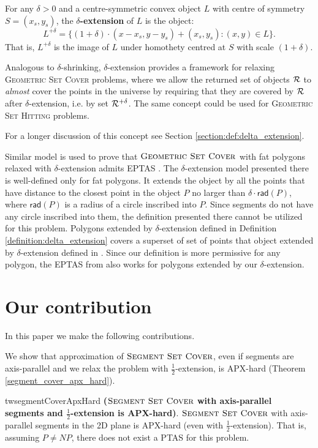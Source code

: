 \begin{defi}
\label{definition:delta_extension}
For any $\delta > 0$ and a centre-symmetric convex object $L$ with
centre of symmetry $S = (x_s, y_s)$,
the \textbf{$\delta$-extension} of $L$ is the object:
$$L^{+\delta} = \{(1 + \delta)\cdot(x - x_s, y - y_s) + (x_s, y_s) : (x, y) \in L\}.$$
That is, $L^{+\delta}$ is the image of $L$ under homothety centred
at $S$ with scale $(1+\delta)$.
\end{defi}

Analogous to $\delta$-shrinking,
$\delta$-extension provides a framework for relaxing
\textsc{Geometric} \textsc{Set} \textsc{Cover} problems, where we allow the returned set of
objects $\mathcal{R}$ to \textit{almost} cover the points in the universe
by requiring that they are covered by $\mathcal{R}$ after $\delta$-extension,
i.e. by set $\mathcal{R}^{+\delta}$.
The same concept could be used for \textsc{Geometric Set Hitting} problems.
 
For a longer discussion of this concept see Section
\ref{section:def:delta_extension}.

Similar model is used to prove that $\textsc{Geometric Set Cover}$ with fat polygons
relaxed with $\delta$-extension admits EPTAS \cite{harpeled12}.
The $\delta$-extension model presented there is well-defined only
for fat polygons. It extends the object by all the points that
have distance to the closest point in the object $P$
no larger than $\delta\cdot \mathsf{rad}(P)$, where $\mathsf{rad}(P)$
is a radius of a circle inscribed into $P$.
Since segments do not have any circle inscribed into them,
the definition presented there cannot be utilized for this problem.
Polygons extended by $\delta$-extension
defined in Definition \ref{definition:delta_extension}
covers a superset of set of points that object extended
by $\delta$-extension defined in \cite{harpeled12}.
Since our definition is more permissive for any polygon,
the EPTAS from \cite{harpeled12}
also works for polygons extended by our $\delta$-extension.

\section*{Our contribution}
In this paper we make the following contributions.

We show that approximation of $\textsc{Segment Set Cover}$,
even if segments are axis-parallel and we relax the problem with  $\frac{1}{2}$-extension,
is APX-hard (Theorem \ref{segment_cover_apx_hard}).

\begin{restatable}{tw}{segmentCoverApxHard}{
\label{segment_cover_apx_hard}
	\textbf{($\textsc{Segment Set Cover}$ with axis-parallel segments and $\frac{1}{2}$-extension is APX-hard)}.	
	$\textsc{Segment Set Cover}$
	with axis-parallel segments in the 2D plane
	is APX-hard (even with $\frac{1}{2}$-extension).
	That is, assuming $P\neq NP$, there does not exist a PTAS
	for this problem.
}\end{restatable}

